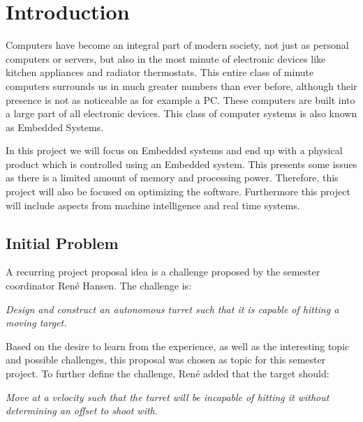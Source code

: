 \chapter{Introduction}
Computers have become an integral part of modern society, not just as personal
computers or servers, but also in the most minute of electronic devices
like kitchen appliances and radiator thermostats. This entire class of minute
computers surrounds us in much greater numbers than ever before, although their
presence is not as noticeable as for example a PC. These computers are built
into a large part of all electronic devices. This class of computer systems is
also known as Embedded Systems.\nl

In this project we will focus on Embedded systems and end up with a physical
product which is controlled using an Embedded system. This presents some issues
as there is a limited amount of memory and processing power. Therefore, this
project will also be focused on optimizing the software. Furthermore this
project will include aspects from machine intelligence and real time systems. 

\section{Initial Problem}
A recurring project proposal idea is a challenge proposed by the semester coordinator Ren\'e
Hansen. The challenge is:

\begin{center}
\begin{minipage}{0.8\linewidth}
\textit{Design and construct an autonomous turret such that it is capable of
hitting a moving target.}
\end{minipage}
\end{center}

Based on the desire to learn from the experience, as well as the interesting
topic and possible challenges, this proposal was chosen as topic for this
semester project. To further define the challenge, Ren\'e added that the target
should:
\begin{center}
\begin{minipage}{0.8\linewidth}
\textit{Move at a velocity such that the turret will be incapable
of hitting it without determining an offset to shoot with.}
\end{minipage}
\end{center}

